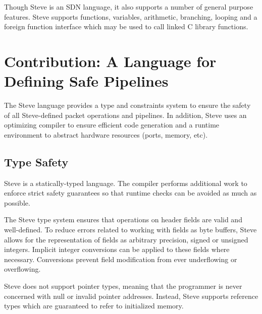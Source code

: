 Though Steve is an SDN language, it also supports a number of general purpose
features. 
Steve supports functions, variables, arithmetic, branching, 
looping and a foreign function interface which may be used to call linked C 
library functions.

\section{Contribution: A Language for Defining Safe Pipelines}

The Steve language provides a type and constraints system to ensure the safety
of all Steve-defined packet operations and pipelines.
In addition, Steve uses an optimizing compiler to ensure efficient code
generation
and a runtime environment to abstract hardware resources (ports, memory, etc).

\subsection{Type Safety}

Steve is a statically-typed language. The compiler performs additional work to
enforce strict safety guarantees so that runtime checks can be avoided as much
as possible.

The Steve type system ensures that operations on header fields are valid and
well-defined. 
To reduce errors related to working with fields as byte buffers, Steve allows
for the representation of fields as arbitrary precision, signed or unsigned
integers.
Implicit integer conversions can be applied to these fields where necessary.
Conversions prevent field modification from ever underflowing or overflowing.

Steve does not support pointer types, meaning that the programmer is never
concerned with null or invalid pointer addresses. Instead, Steve supports
reference
types which are guaranteed to refer to initialized memory.

%
%
%


